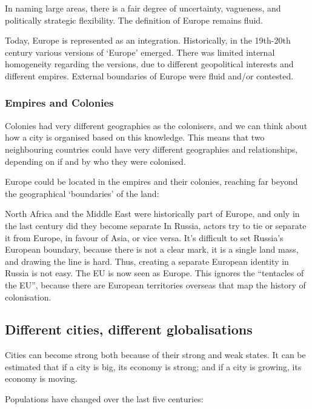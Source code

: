 \documentclass{article}
\begin{document}
In naming large areas, there is a fair degree of uncertainty, vagueness, and politically strategic flexibility. The definition of Europe remains fluid. 

Today, Europe is represented as an integration. Historically, in the 19th-20th century various versions of `Europe' emerged. There was limited internal homogeneity regarding the versions, due to different geopolitical interests and different empires. External boundaries of Europe were fluid and/or contested.

\subsubsection{Empires and Colonies} 

Colonies had very different geographies as the colonisers, and we can think about how a city is organised based on this knowledge. This means that two neighbouring countries could have very different geographies and relationships, depending on if and by who they were colonised.

Europe could be located in the empires and their colonies, reaching far beyond the geographical `boundaries' of the land:

\begin{outline}
	\1 North Africa and the Middle East were historically part of Europe, and only in the last century did they become separate
	\1 In Russia, actors try to tie or separate it from Europe, in favour of Asia, or vice versa. It's difficult to set Russia's European boundary, because there is not a clear mark, it is a single land mass, and drawing the line is hard. Thus, creating a separate European identity in Russia is not easy.
	\1 The EU is now seen as Europe. This ignores the ``tentacles of the EU'', because there are European territories overseas that map the history of colonisation.
\end{outline}


\subsection{Different cities, different globalisations}

Cities can become strong both because of their strong and weak states. It can be estimated that if a city is big, its economy is strong; and if a city is growing, its economy is moving.

Populations have changed over the last five centuries:
\end{document}
